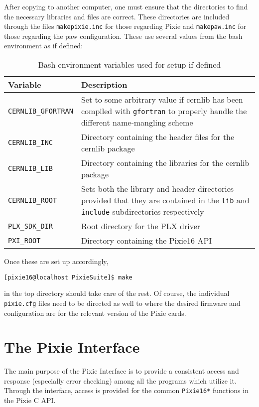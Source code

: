 \documentclass{article}
\begin{document}
After copying to another computer, one must ensure that the directories to
find the necessary libraries and files are correct. These directories are
included through the files \texttt{makepixie.inc} for those regarding Pixie
and \texttt{makepaw.inc} for those regarding the paw configuration. These use
several values from the bash environment as if defined:
\begin{table}[ht]
\label{fig:bashenv}
\caption{Bash environment variables used for setup if defined}
\begin{tabular}{lp{3in}}
\hline
Variable & Description \\
\hline
\texttt{CERNLIB\_GFORTRAN} & Set to some arbitrary value if cernlib has been
compiled with \texttt{gfortran} to properly handle the different name-mangling
scheme \\
\texttt{CERNLIB\_INC}      & Directory containing the header files for the cernlib
package \\
\texttt{CERNLIB\_LIB}      & Directory containing the libraries for the
cernlib package \\
\texttt{CERNLIB\_ROOT}     & Sets both the library and header directories provided
that they are contained in the \texttt{lib} and \texttt{include}
subdirectories respectively \\
\texttt{PLX\_SDK\_DIR}     & Root directory for the PLX driver \\
\texttt{PXI\_ROOT}         & Directory containing the Pixie16 API \\
\end{tabular}
\end{table}
Once these are set up accordingly,
\begin{verbatim}
[pixie16@localhost PixieSuite]$ make
\end{verbatim}
in the top directory should take care of the rest. Of course, the individual \texttt{pixie.cfg} files need to be directed as well to where the desired firmware and configuration are for the relevant version of the Pixie cards.
\section{\label{sec:pi}The Pixie Interface}
The main purpose of the Pixie Interface is to provide a consistent access and response (especially error checking) among all the programs which utilize it. Through the interface, access is provided for the common \texttt{Pixie16*} functions in the Pixie C API. 
\end{document}
